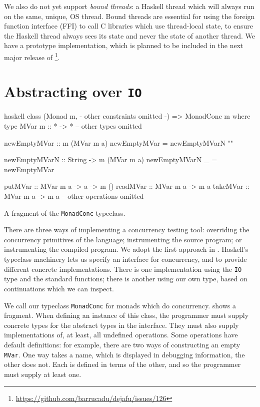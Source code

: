 We also do not yet support \emph{bound threads}: a Haskell thread
which will always run on the same, unique, OS thread.  Bound threads
are essential for using the foreign function interface (FFI) to call C
libraries which use thread-local state, to ensure the Haskell thread
always sees its state and never the state of another thread.  We have
a prototype implementation, which is planned to be included in the
next major release of
\dejafu{}\footnote{\url{https://github.com/barrucadu/dejafu/issues/126}}.

\section{Abstracting over \texttt{IO}}
\label{sec:dejafu-monadconc}

\begin{listing}
\centering
\begin{cminted}{haskell}
class (Monad m, {- other constraints omitted -}) => MonadConc m where
  type MVar m :: * -> *
  -- other types omitted

  newEmptyMVar :: m (MVar m a)
  newEmptyMVar = newEmptyMVarN ""

  newEmptyMVarN :: String -> m (MVar m a)
  newEmptyMVarN _ = newEmptyMVar

  putMVar  :: MVar m a -> a -> m ()
  readMVar :: MVar m a -> m a
  takeMVar :: MVar m a -> m a
  -- other operations omitted
\end{cminted}
\caption{A fragment of the \texttt{MonadConc} typeclass.}\label{lst:monadconc}
\end{listing}

There are three ways of implementing a concurrency testing tool:
overriding the concurrency primitives of the language; instrumenting
the source program; or instrumenting the compiled program.  We adopt
the first approach in \dejafu{}.  Haskell's typeclass machinery lets
us specify an interface for concurrency, and to provide different
concrete implementations.  There is one implementation using the
\verb|IO| type and the standard functions; there is another using our
own type, based on continuations which we can inspect.

We call our typeclass \verb|MonadConc| for monads which do
concurrency.   shows a fragment.  When defining an
instance of this class, the programmer must supply concrete types for
the abstract types in the interface.  They must also supply
implementations of, at least, all undefined operations.  Some
operations have default definitions: for example, there are two ways
of constructing an empty \verb|MVar|.  One way takes a name, which is
displayed in debugging information, the other does not.  Each is
defined in terms of the other, and so the programmer must supply at
least one.

